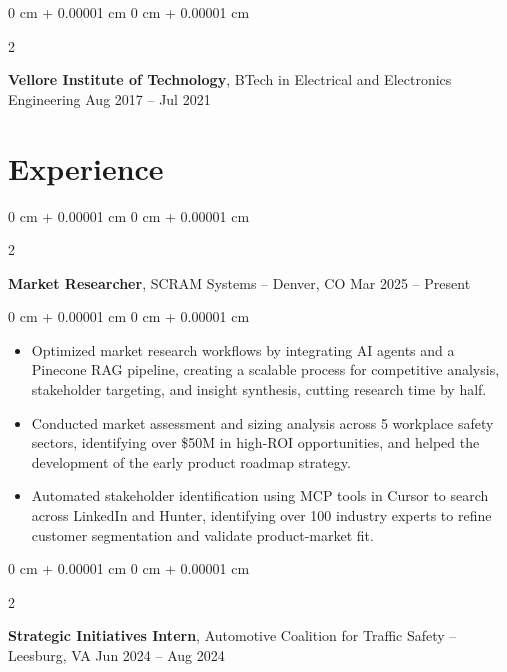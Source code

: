 \documentclass[10pt, letterpaper]{article}
\newenvironment{highlights}{
    \begin{itemize}[
        topsep=0.10 cm,
        parsep=0.10 cm,
        partopsep=0pt,
        itemsep=0pt,
        leftmargin=0 cm + 10pt
    ]
}{
    \end{itemize}
} %
\newenvironment{onecolentry}{
    \begin{adjustwidth}{
        0 cm + 0.00001 cm
    }{
        0 cm + 0.00001 cm
    }
}{
    \end{adjustwidth}
} %
\newenvironment{twocolentry}[2][]{
    \onecolentry
    \def\secondColumn{#2}
    \setcolumnwidth{\fill, 4.5 cm}
    \begin{paracol}{2}
}{
    \switchcolumn \raggedleft \secondColumn
    \end{paracol}
    \endonecolentry
} %
\begin{document}
\vspace{0.15 cm}



        \begin{twocolentry}{
            Aug 2017 – Jul 2021
        }
            \textbf{Vellore Institute of Technology}, BTech in Electrical and Electronics Engineering\end{twocolentry}



    
    \section{Experience}



        
        \begin{twocolentry}{
            Mar 2025 – Present
        }
            \textbf{Market Researcher}, SCRAM Systems -- Denver, CO\end{twocolentry}

        \vspace{0.10 cm}
        \begin{onecolentry}
            \begin{highlights}
                \item Optimized market research workflows by integrating AI agents and a Pinecone RAG pipeline, creating a scalable process for competitive analysis, stakeholder targeting, and insight synthesis, cutting research time by half.

                \item Conducted market assessment and sizing analysis across 5 workplace safety sectors, identifying over \$50M in high-ROI opportunities, and helped the development of the early product roadmap strategy.

                \item Automated stakeholder identification using MCP tools in Cursor to search across LinkedIn and Hunter, identifying over 100 industry experts to refine customer segmentation and validate product-market fit.

            \end{highlights}
        \end{onecolentry}

        \vspace{0.2 cm}
                \begin{twocolentry}{
            Jun 2024 – Aug 2024
        }
            \textbf{Strategic Initiatives Intern}, Automotive Coalition for Traffic Safety -- Leesburg, VA\end{twocolentry}
\end{document}
